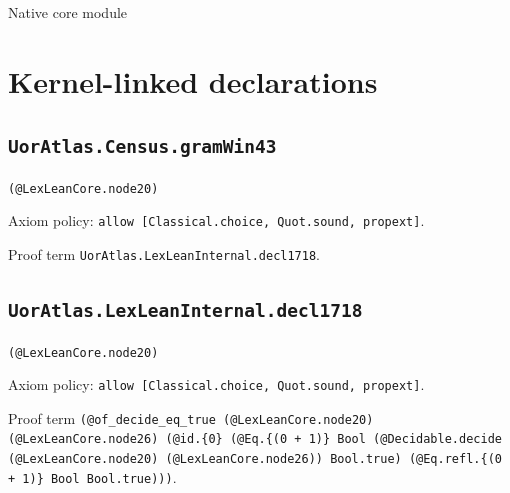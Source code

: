 \documentclass[11pt]{article}
\begin{document}
\begin{center}{\LARGE Native core module}\end{center}
\section*{Kernel-linked declarations}
\subsection*{\texttt{UorAtlas.Census.gramWin43}}
\noindent\texttt{(@LexLeanCore.node20)}\par
\noindent Axiom policy: \texttt{allow [Classical.choice, Quot.sound, propext]}.\par
\noindent Proof term \texttt{UorAtlas.LexLeanInternal.decl1718}.\par
\subsection*{\texttt{UorAtlas.LexLeanInternal.decl1718}}
\noindent\texttt{(@LexLeanCore.node20)}\par
\noindent Axiom policy: \texttt{allow [Classical.choice, Quot.sound, propext]}.\par
\noindent Proof term \texttt{(@of\_decide\_eq\_true (@LexLeanCore.node20) (@LexLeanCore.node26) (@id.\{0\} (@Eq.\{(0 + 1)\} Bool (@Decidable.decide (@LexLeanCore.node20) (@LexLeanCore.node26)) Bool.true) (@Eq.refl.\{(0 + 1)\} Bool Bool.true)))}.\par
\end{document}
